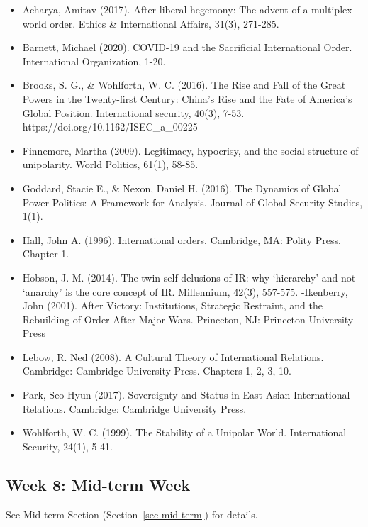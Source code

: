 \documentclass[
  letterpaper,
  DIV=11,
  numbers=noendperiod]{scrartcl}
\providecommand{\tightlist}{%
  \setlength{\itemsep}{0pt}\setlength{\parskip}{0pt}}\usepackage{longtable,booktabs,array}
\begin{document}
\begin{itemize}
\tightlist
\item
  Acharya, Amitav (2017). After liberal hegemony: The advent of a
  multiplex world order. Ethics \& International Affairs, 31(3),
  271-285.
\item
  Barnett, Michael (2020). COVID-19 and the Sacrificial International
  Order. International Organization, 1-20.
\item
  Brooks, S. G., \& Wohlforth, W. C. (2016). The Rise and Fall of the
  Great Powers in the Twenty-first Century: China's Rise and the Fate of
  America's Global Position. International security, 40(3), 7-53.
  https://doi.org/10.1162/ISEC\_a\_00225
\item
  Finnemore, Martha (2009). Legitimacy, hypocrisy, and the social
  structure of unipolarity. World Politics, 61(1), 58-85.
\item
  Goddard, Stacie E., \& Nexon, Daniel H. (2016). The Dynamics of Global
  Power Politics: A Framework for Analysis. Journal of Global Security
  Studies, 1(1).
\item
  Hall, John A. (1996). International orders. Cambridge, MA: Polity
  Press. Chapter 1.
\item
  Hobson, J. M. (2014). The twin self-delusions of IR: why `hierarchy'
  and not `anarchy' is the core concept of IR. Millennium, 42(3),
  557-575. -Ikenberry, John (2001). After Victory: Institutions,
  Strategic Restraint, and the Rebuilding of Order After Major Wars.
  Princeton, NJ: Princeton University Press
\item
  Lebow, R. Ned (2008). A Cultural Theory of International Relations.
  Cambridge: Cambridge University Press. Chapters 1, 2, 3, 10.
\item
  Park, Seo-Hyun (2017). Sovereignty and Status in East Asian
  International Relations. Cambridge: Cambridge University Press.
\item
  Wohlforth, W. C. (1999). The Stability of a Unipolar World.
  International Security, 24(1), 5-41.
\end{itemize}

\hypertarget{week-8-mid-term-week}{%
\subsection*{Week 8: Mid-term Week}\label{week-8-mid-term-week}}

See Mid-term Section (Section~\ref{sec-mid-term}) for details.
\end{document}
